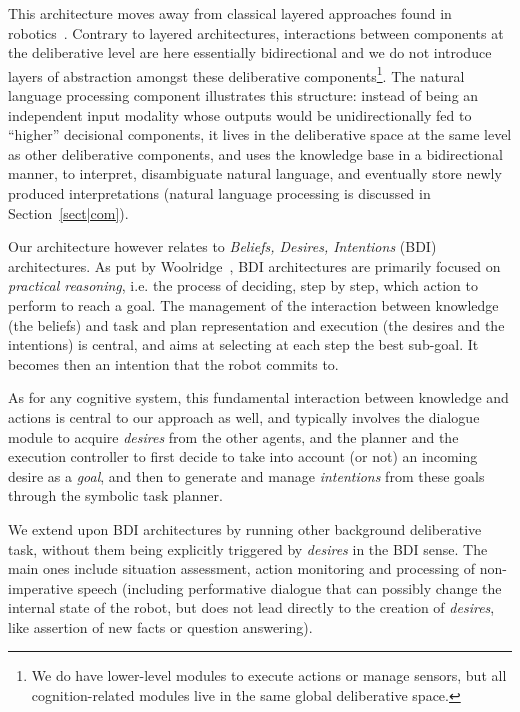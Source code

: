 \documentclass[preprint,3p,times]{elsarticle}
\newcommand{\ie}{i.e.\xspace}
\begin{document}
This architecture moves away from classical layered approaches found in
robotics~\cite{Gat1998three, Volpe2001CLARAty, Goldberg2002}. Contrary to
layered architectures, interactions between components at the deliberative level
are here essentially bidirectional and we do not introduce layers of abstraction
amongst these deliberative components\footnote{We do have lower-level modules to
execute actions or manage sensors, but all cognition-related modules live in the
same global deliberative space.}. The natural language processing component
illustrates this structure: instead of being an independent input modality whose
outputs would be unidirectionally fed to ``higher'' decisional components, it
lives in the deliberative space at the same level as other deliberative
components, and uses the knowledge base in a bidirectional manner, to interpret,
disambiguate natural language, and eventually store newly produced
interpretations (natural language processing is discussed in
Section~\ref{sect|com}).

Our architecture however relates to \emph{Beliefs, Desires, Intentions} (BDI)
architectures. As put by Woolridge~\cite{Woolridge1999}, BDI architectures are
primarily focused on \emph{practical reasoning}, \ie the process of deciding,
step by step, which action to perform to reach a goal. The management of the
interaction between knowledge (the beliefs) and task and plan representation and
execution (the desires and the intentions) is central, and aims at selecting at
each step the best sub-goal. It becomes then an intention that the robot commits
to.

As for any cognitive system, this fundamental interaction between knowledge and
actions is central to our approach as well, and typically involves the dialogue
module to acquire \emph{desires} from the other agents, and the planner and the
execution controller to first decide to take into account (or not) an
incoming desire as a \emph{goal}, and then to generate and manage
\emph{intentions} from these goals through the symbolic task planner.

We extend upon BDI architectures by running other background deliberative task,
without them being explicitly triggered by \emph{desires} in the BDI sense.
The main ones include situation assessment, action monitoring and processing of
non-imperative speech (including performative dialogue that can possibly change
the internal state of the robot, but does not lead directly to the creation of
\emph{desires}, like assertion of new facts or question answering).
\end{document}

